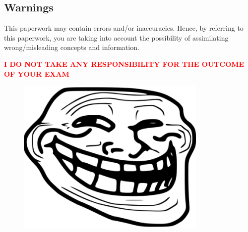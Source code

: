 \documentclass[11pt, a4paper]{article}
\begin{document}
\subsection*{Warnings}
This paperwork may contain errors and/or inaccuracies. Hence, by referring to this paperwork, you are taking into account the possibility of assimilating wrong/misleading concepts and information.
\begin{center}
    \textcolor{red}{\textbf{I DO NOT TAKE ANY RESPONSIBILITY FOR THE OUTCOME OF YOUR EXAM}}
\end{center}
\begin{figure}[H]
    \centering
    \includegraphics[scale=0.5]{utili/Trollface.png}
\end{figure}

\newpage
\tableofcontents


\end{document}
